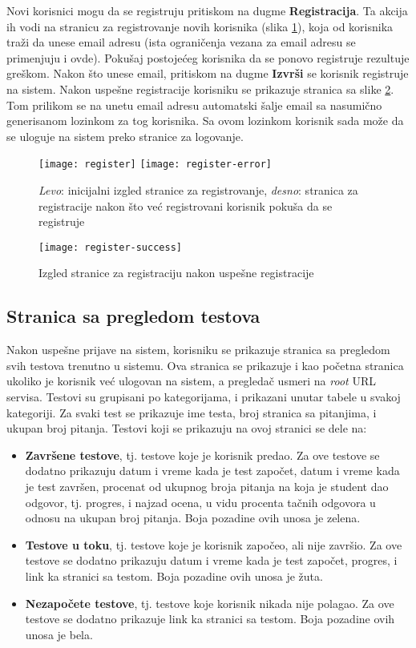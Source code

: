 Novi korisnici mogu da se registruju pritiskom na dugme \textbf{Registracija}. Ta akcija ih vodi na stranicu za registrovanje novih korisnika (slika \ref{fig:register}), koja od korisnika traži da unese email adresu (ista ograničenja vezana za email adresu se primenjuju i ovde). Pokušaj postojećeg korisnika da se ponovo registruje rezultuje greškom. Nakon što unese email, pritiskom na dugme \textbf{Izvrši} se korisnik registruje na sistem. Nakon uspešne registracije korisniku se prikazuje stranica sa slike \ref{fig:register-success}. Tom prilikom se na unetu email adresu automatski šalje email sa nasumično generisanom lozinkom za tog korisnika. Sa ovom lozinkom korisnik sada može da se uloguje na sistem preko stranice za logovanje.
\begin{figure}[p]
\texttt{[image: register]}
\texttt{[image: register-error]}
\caption{\textit{Levo}: inicijalni izgled stranice za registrovanje, \textit{desno}: stranica za registracije nakon što već registrovani korisnik pokuša da se registruje}
\label{fig:register}
\end{figure}
\begin{figure}[h]
\texttt{[image: register-success]}
\caption{Izgled stranice za registraciju nakon uspešne registracije}
\label{fig:register-success}
\end{figure}

\subsection{Stranica sa pregledom testova}
Nakon uspešne prijave na sistem, korisniku se prikazuje stranica sa pregledom svih testova trenutno u sistemu. Ova stranica se prikazuje i kao početna stranica ukoliko je korisnik već ulogovan na sistem, a pregledač usmeri na \textit{root} URL servisa. Testovi su grupisani po kategorijama, i prikazani unutar tabele u svakoj kategoriji. Za svaki test se prikazuje ime testa, broj stranica sa pitanjima, i ukupan broj pitanja. Testovi koji se prikazuju na ovoj stranici se dele na:
\begin{itemize}
\renewcommand\labelitemi{--}
\item \textbf{Završene testove}, tj. testove koje je korisnik predao. Za ove testove se dodatno prikazuju datum i vreme kada je test započet, datum i vreme kada je test završen, procenat od ukupnog broja pitanja na koja je student dao odgovor, tj. progres, i najzad ocena, u vidu procenta tačnih odgovora u odnosu na ukupan broj pitanja. Boja pozadine ovih unosa je zelena.
\item \textbf{Testove u toku}, tj. testove koje je korisnik započeo, ali nije završio. Za ove testove se dodatno prikazuju datum i vreme kada je test započet, progres, i link ka stranici sa testom. Boja pozadine ovih unosa je žuta.
\item \textbf{Nezapočete testove}, tj. testove koje korisnik nikada nije polagao. Za ove testove se dodatno prikazuje link ka stranici sa testom. Boja pozadine ovih unosa je bela.
\end{itemize}
